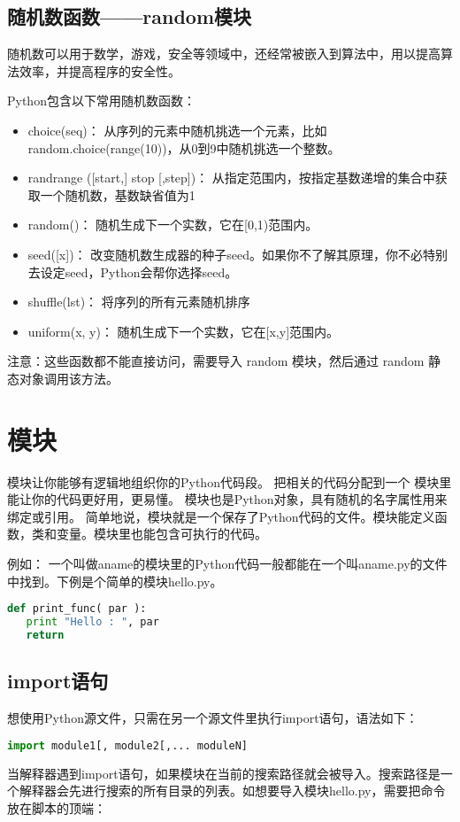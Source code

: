 \subsection{随机数函数——random模块}
随机数可以用于数学，游戏，安全等领域中，还经常被嵌入到算法中，用以提高算法效率，并提高程序的安全性。

Python包含以下常用随机数函数：
\begin{itemize}
\item choice(seq)：	从序列的元素中随机挑选一个元素，比如random.choice(range(10))，从0到9中随机挑选一个整数。
\item randrange ([start,] stop [,step])：	从指定范围内，按指定基数递增的集合中获取一个随机数，基数缺省值为1
\item random()：	随机生成下一个实数，它在[0,1)范围内。
\item seed([x])：	改变随机数生成器的种子seed。如果你不了解其原理，你不必特别去设定seed，Python会帮你选择seed。
\item shuffle(lst)：	将序列的所有元素随机排序
\item uniform(x, y)：	随机生成下一个实数，它在[x,y]范围内。
\end{itemize}

注意：这些函数都不能直接访问，需要导入 random 模块，然后通过 random 静态对象调用该方法。






\section{模块}
模块让你能够有逻辑地组织你的Python代码段。
把相关的代码分配到一个 模块里能让你的代码更好用，更易懂。
模块也是Python对象，具有随机的名字属性用来绑定或引用。
简单地说，模块就是一个保存了Python代码的文件。模块能定义函数，类和变量。模块里也能包含可执行的代码。

例如：
一个叫做aname的模块里的Python代码一般都能在一个叫aname.py的文件中找到。下例是个简单的模块hello.py。
\begin{lstlisting}[language=Python]
def print_func( par ):
   print "Hello : ", par
   return
\end{lstlisting}



\subsection{import语句}
想使用Python源文件，只需在另一个源文件里执行import语句，语法如下：
\begin{lstlisting}[language=Python]
import module1[, module2[,... moduleN]
\end{lstlisting}
当解释器遇到import语句，如果模块在当前的搜索路径就会被导入。搜索路径是一个解释器会先进行搜索的所有目录的列表。如想要导入模块hello.py，需要把命令放在脚本的顶端：

